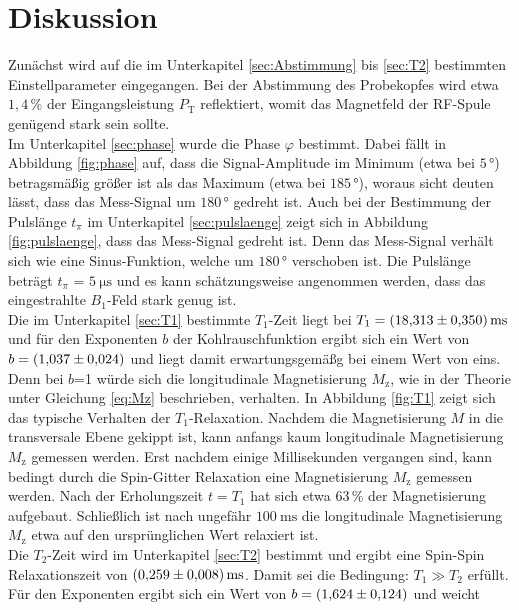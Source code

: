 \section{Diskussion}
\label{sec:Diskussion}
Zunächst wird auf die im Unterkapitel \ref{sec:Abstimmung} bis \ref{sec:T2}
bestimmten Einstellparameter eingegangen.
Bei der Abstimmung des Probekopfes wird etwa $1,4\,\%$ der Eingangsleistung
$P_{\text{T}}$ reflektiert, womit das Magnetfeld der RF-Spule genügend stark sein
sollte.\\
Im Unterkapitel \ref{sec:phase} wurde die Phase $\varphi$ bestimmt. Dabei fällt
in Abbildung \ref{fig:phase} auf, dass die Signal-Amplitude im Minimum (etwa bei $5\,°$)
betragsmäßig größer ist als das Maximum (etwa bei $185\,°$), woraus sicht deuten
lässt, dass das Mess-Signal um $180\,°$ gedreht ist.
Auch bei der Bestimmung der Pulslänge $t_{\pi}$ im Unterkapitel \ref{sec:pulslaenge}
zeigt sich in Abbildung \ref{fig:pulslaenge}, dass das Mess-Signal gedreht ist.
Denn das Mess-Signal verhält sich wie eine Sinus-Funktion, welche um $180\,°$
verschoben ist. Die Pulslänge beträgt $t_{\pi}$ = $\SI{5}{\micro\second}$ und es
kann schätzungsweise angenommen werden, dass das eingestrahlte
$B_1$-Feld stark genug ist.\\
Die im Unterkapitel \ref{sec:T1} bestimmte $T_1$-Zeit liegt bei
$T_1 = \SI{18.313\pm0.350}{\milli\second}$ und für den Exponenten $b$ der
Kohlrauschfunktion ergibt sich ein Wert von $b = \SI{1,037\pm0,024}{}$ und liegt
damit erwartungsgemäßg bei einem Wert von eins. Denn bei $b$=1 würde sich die longitudinale
Magnetisierung $M_{\text{z}}$, wie in der Theorie unter Gleichung \ref{eq:Mz}
beschrieben, verhalten. In Abbildung \ref{fig:T1} zeigt sich das typische Verhalten
der $T_1$-Relaxation. Nachdem die Magnetisierung $M$ in die transversale Ebene gekippt ist,
kann anfangs kaum longitudinale Magnetisierung $M_{\text{z}}$ gemessen werden.
Erst nachdem einige Millisekunden vergangen sind, kann bedingt durch die Spin-Gitter
Relaxation eine Magnetisierung $M_{\text{z}}$ gemessen werden. Nach der Erholungszeit
$t=T_1$ hat sich etwa $63\,\%$ der Magnetisierung aufgebaut. Schließlich ist nach
ungefähr $\SI{100}{\milli\second}$ die longitudinale Magnetisierung $M_{\text{z}}$
etwa auf den ursprünglichen Wert relaxiert ist.\\
Die $T_2$-Zeit wird im Unterkapitel \ref{sec:T2} bestimmt und ergibt eine Spin-Spin
Relaxationszeit von $\SI{0.259\pm0.008}{\milli\second}$. Damit sei die Bedingung:
$T_1 \gg T_2$ erfüllt.
Für den Exponenten ergibt sich ein Wert von $b = \SI{1,624\pm0,124}{}$ und weicht
